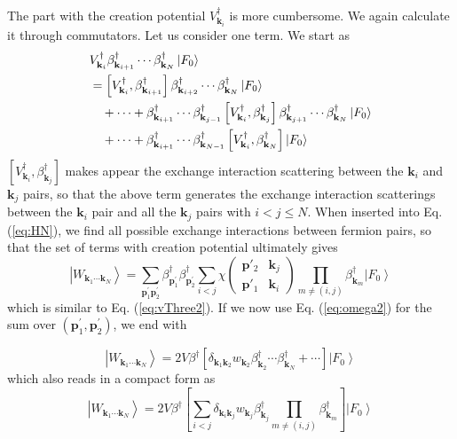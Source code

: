 \documentclass[epj]{svjour}
\newcommand{\vk}{\ensuremath{\mathbf{k}}}
\newcommand{\vp}{\ensuremath{\mathbf{p}}}
\begin{document}
 The part with the creation potential $V^\dagger_{\mathbf{k}_i}$ is more cumbersome.  We again calculate it through commutators.  Let us consider one term. We start as
\begin{equation}
\begin{split}
&V^{\dagger}_{\mathbf{k} _{i}}\beta^{\dagger}_{\mathbf{k} _{i+1}}\cdots\beta^{\dagger}_{\mathbf{k}
_N}\left|F_0\right> \\
&=\left[V^{\dagger}_{\mathbf{k} _{i}},\beta^{\dagger}_{\mathbf{k} _{i+1}}\right]  \beta^{\dagger}_{%
\mathbf{k} _{i+2}}\cdots\beta^{\dagger}_{\mathbf{k} _N}\left|F_0\right> \\
&\quad+\cdots+\beta^{\dagger}_{\mathbf{k} _{i+1}}\cdots\beta^{\dagger}_{\mathbf{k} _{j-1}}
\left[V^{\dagger}_{\mathbf{k} _{i}},\beta^{\dagger}_{\mathbf{k} _j}\right]  \beta^{\dagger}_{\mathbf{k}
_{j+1}}\cdots \beta^{\dagger}_{\mathbf{k}_{N}}\left|F_0\right>\\
&\quad+\cdots+\beta^{\dagger}_{\mathbf{k} _{i+1}}\cdots\beta^{\dagger}_{\mathbf{k} _{N-1}}
\left[V^{\dagger}_{\mathbf{k} _{i}},\beta^{\dagger}_{\mathbf{k} _N}\right] \left|F_0\right>
\end{split}
\end{equation}
 $\left[V^{\dagger}_{\mathbf{k} _{i}},\beta^{\dagger}_{\mathbf{k} _j}\right]$ makes appear the  exchange interaction scattering between the $\vk_i$ and $\vk_j$ pairs, so that the above term generates the exchange interaction scatterings between the $\mathbf{k} _{i}$ pair and all the $\mathbf{k} _{j}$ pairs with  $i<j\leq{N}$.  When inserted into Eq. (\ref{eq:HN}), we find all possible exchange interactions between fermion pairs, so that the set of terms with creation potential ultimately gives
\begin{equation}  
\left|W_{\mathbf{k} _1\cdots\mathbf{k} _N}\right>=\sum_{\vp^{\prime}_1\mathbf{p} ^{\prime}_2}\beta^{\dagger}_{\mathbf{p}
^{\prime}_1}\beta^{\dagger}_{\mathbf{p} ^{\prime}_2} \sum_{i<j}\chi\left(\begin{smallmatrix}\vp'_2&\vk_j\\\vp'_1&\vk_i%
\end{smallmatrix}\right)  \prod_{m\neq(i,j)}\beta^{\dagger}_{\mathbf{k} _m} \left|F_0\right>  
\end{equation}
 which is similar to Eq. (\ref{eq:vThree2}).  If we now use Eq. (\ref{eq:omega2}) for the sum over $(\vp^{\prime}_1,\mathbf{p} ^{\prime}_2)$, we end with 
 
  \begin{equation}  
\left|W_{\mathbf{k} _1\cdots\mathbf{k} _N}\right>=2V\beta^\dagger[ \delta_{\vk_1\vk_2}w_{\vk_2}\beta^{\dagger}_{\mathbf{k} _2}\cdots\beta^{\dagger}_{\mathbf{k} _N}+\cdots ]\left|F_0\right>  
\end{equation}
which also reads in a compact form as 
 \begin{equation}  
\left|W_{\mathbf{k} _1\cdots\mathbf{k} _N}\right>=2V\beta^\dagger\left[ \sum_{i<j}\delta_{\vk_i\vk_j}w_{\vk_j}\beta^\dagger_{\vk_j}\prod_{m\neq(i,j)}\beta^{\dagger}_{\mathbf{k} _m} \right]\left|F_0\right>  
\end{equation}
\end{document}
